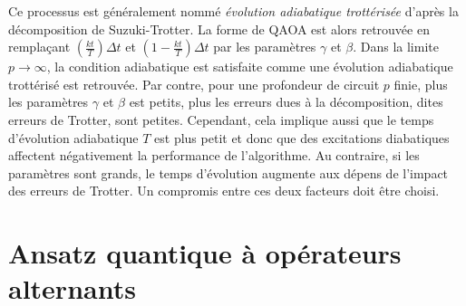 Ce processus est généralement nommé \textit{évolution adiabatique trottérisée} d'après la décomposition de Suzuki-Trotter. La forme de QAOA est alors retrouvée en remplaçant $(\frac{kt}{T}) \Delta t$ et $(1 - \frac{kt}{T}) \Delta t$ par les paramètres $\gamma$ et $\beta$. Dans la limite $p \to \infty$, la condition adiabatique est satisfaite comme une évolution adiabatique trottérisé est retrouvée. Par contre, pour une profondeur de circuit $p$ finie, plus les paramètres $\gamma$ et $\beta$ est petits, plus les erreurs dues à la décomposition, dites erreurs de Trotter, sont petites. Cependant, cela implique aussi que le temps d'évolution adiabatique $T$ est plus petit et donc que des excitations diabatiques affectent négativement la performance de l'algorithme. Au contraire, si les paramètres sont grands, le temps d'évolution augmente aux dépens de l'impact des erreurs de Trotter. Un compromis entre ces deux facteurs doit être choisi.


\section{Ansatz quantique à opérateurs alternants}
\label{sec:ansatz-quantique-a-operateurs-alternants}

